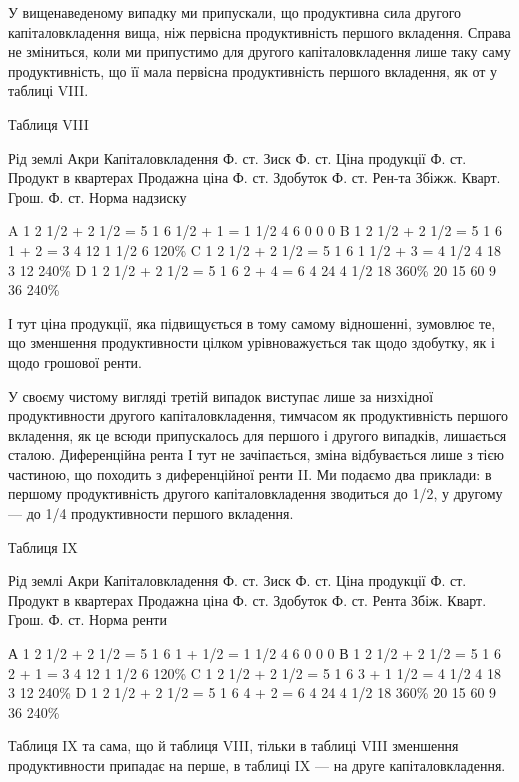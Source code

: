 У вищенаведеному випадку ми припускали, що продуктивна сила другого
капіталовкладення вища, ніж первісна продуктивність першого вкладення. Справа
не зміниться, коли ми припустимо для другого капіталовкладення лише таку саму
продуктивність, що її мала первісна продуктивність першого вкладення, як от у
таблиці VIII.

Таблиця VIII

Рід землі
Акри
Капіталовкладення Ф. ст.
Зиск Ф. ст.
Ціна продукції Ф. ст.
Продукт в квартерах
Продажна ціна Ф. ст.
Здобуток Ф. ст.
Рен-та
Збіжж. Кварт.
Грош. Ф. ст.
Норма надзиску

A    1    2 1/2 + 2 1/2 = 5    1     6      1/2 + 1 = 1 1/2       4      6            0            0
        0
B    1    2 1/2 + 2 1/2 = 5    1     6      1 + 2 = 3                  4    12           1 1/2
6       120\%
C    1    2 1/2 + 2 1/2 = 5    1     6      1 1/2 + 3 = 4 1/2    4    18            3           12
    240\%
D    1    2 1/2 + 2 1/2 = 5    1     6      2 + 4 = 6                  4    24            4 1/2
18       360\%
                                      20                                 15                    60
       9             36      240\%

І тут ціна продукції, яка підвищується в тому самому відношенні, зумовлює
те, що зменшення продуктивности цілком урівноважується так щодо здобутку,
як і щодо грошової ренти.

У своєму чистому вигляді третій випадок виступає лише за низхідної продуктивности
другого капіталовкладення, тимчасом як продуктивність першого вкладення,
як це всюди припускалось для першого і другого випадків, лишається сталою.
Диференційна рента І тут не зачіпається, зміна відбувається лише з тією частиною,
що походить з диференційної ренти II. Ми подаємо два приклади: в
першому продуктивність другого капіталовкладення зводиться до 1/2, у другому
— до 1/4 продуктивности першого вкладення.

Таблиця IX

Рід землі
Акри
Капіталовкладення Ф. ст.
Зиск Ф. ст.
Ціна продукції Ф. ст.
Продукт в квартерах
Продажна  ціна Ф. ст.
Здобуток Ф. ст.
Рента
Збіж. Кварт.
Грош. Ф. ст.
Норма ренти

А    1    2 1/2 + 2 1/2 = 5       1    6      1 + 1/2 = 1 1/2         4       6           0
     0            0
В    1    2 1/2 + 2 1/2 = 5       1     6      2 + 1 = 3                   4     12           1 1/2
      6          120\%
C    1    2 1/2 + 2 1/2 = 5       1     6      3 + 1 1/2 = 4 1/2     4     18            3
  12          240\%
D    1    2 1/2 + 2 1/2 = 5       1     6      4 + 2 = 6                  4     24             4 1/2
    18          360\%
                                        20                                    15
60              9          36          240\%

Таблиця IX та сама, що й таблиця VIII, тільки в таблиці VIII зменшення
продуктивности припадає на перше, в таблиці IX — на друге капіталовкладення.
